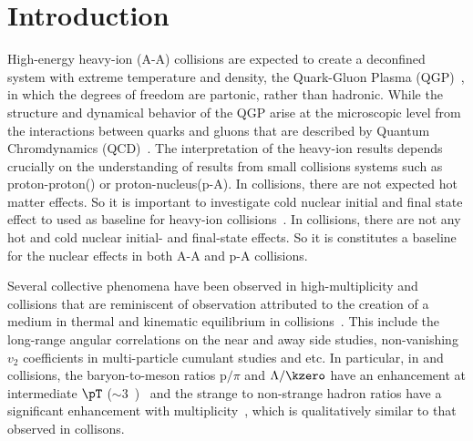 
\section{Introduction}%
\label{sec:Introduction}

High-energy heavy-ion (A-A) collisions are expected to create a deconfined system with extreme temperature and density, the Quark-Gluon Plasma (QGP)~\cite{Rafelski:126179, Satz:2000bn, Shuryak:1983ni, Jacak:2012dx, Cleymans:1985wb, Bass:1998vz, BraunMunzinger:2007zz}, in which the degrees of freedom are partonic, rather than hadronic.
While the structure and dynamical behavior of the QGP arise at the microscopic level from the interactions between quarks and gluons that are described by Quantum Chromdynamics (QCD)~\cite{Laermann:2003cv, Gupta:2011wh, Bhattacharya:2014ara}.
The interpretation of the heavy-ion results depends crucially on the understanding of results from small collisions systems such as proton-proton(\pp) or proton-nucleus(p-A).
In \pPb collisions, there are not expected hot matter effects.
So it is important to investigate cold nuclear initial and final state effect to used as baseline for heavy-ion collisions~\cite{Salgado:2011wc, Eskola:2016oht}.
In \pp collisions, there are not any hot and cold nuclear initial- and final-state effects.
So it is constitutes a baseline for the nuclear effects in both A-A and p-A collisions.

Several collective phenomena have been observed in high-multiplicity \pp and \pPb collisions that are reminiscent of observation attributed to the creation of a medium in thermal and kinematic equilibrium in \PbPb collisions~\cite{Aad:2015gqa, Abelev:2012ola, ABELEV:2013wsa, Khachatryan:2015waa, Abelev:2014uua, Adam:2015vsf}.
This include the long-range angular correlations on the near and away side studies, non-vanishing $v_{2}$ coefficients in multi-particle cumulant studies and etc.
In particular, in \pp and \pPb collisions, the baryon-to-meson ratios p$/\pi$ and $\Lambda/\kzero$ have an enhancement at intermediate $\pT$ ($\sim 3$~\GeVc)~\cite{Acharya:2018orn, Khachatryan:2016yru, Abelev:2013xaa, ALICE:2017jyt} and the strange to non-strange hadron ratios have a significant enhancement with multiplicity~\cite{Abelev:2013haa, ALICE:2017jyt, Khachatryan:2016yru}, which is qualitatively similar to that observed in \PbPb collisons.

